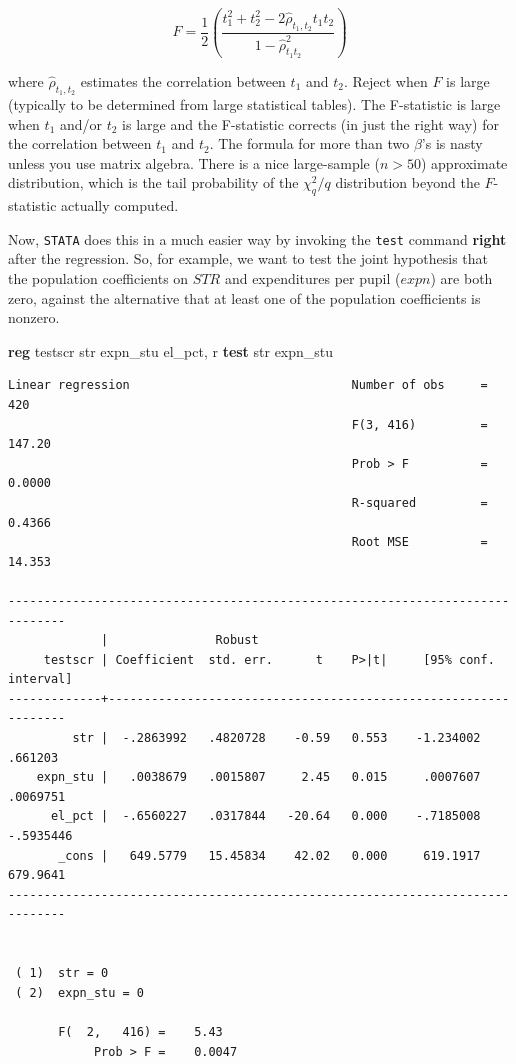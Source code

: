 \documentclass[
]{book}
\newenvironment{Shaded}{\begin{snugshade}}{\end{snugshade}}
\newcommand{\FunctionTok}[1]{\textcolor[rgb]{0.00,0.00,0.00}{#1}}
\newcommand{\KeywordTok}[1]{\textcolor[rgb]{0.13,0.29,0.53}{\textbf{#1}}}
\newcommand{\NormalTok}[1]{#1}
\begin{document}
\begin{equation}
F = \frac{1}{2} \left(\frac{t_1^2 + t_2^2 - 2\hat{\rho}_{t_1,t_2}t_1 t_2}{1-\hat{\rho}^2_{t_1 t_2}}  \right)
\end{equation}

where \(\hat{\rho}_{t_1,t_2}\) estimates the correlation between \(t_1\) and \(t_2\). Reject when \(F\) is large (typically to be determined from large statistical tables). The F-statistic is large when \(t_1\) and/or \(t_2\) is large and the F-statistic corrects (in just the right way) for the correlation between \(t_1\) and \(t_2\). The formula for more than two \(\beta\)'s is nasty unless you use matrix algebra. There is a nice large-sample (\(n>50\)) approximate distribution, which is the tail probability of the \(\chi^2_q /q\) distribution beyond the \(F\)-statistic actually computed.

Now, \texttt{STATA} does this in a much easier way by invoking the \texttt{test} command \textbf{right} after the regression. So, for example, we want to test the joint hypothesis that the population coefficients on \(STR\) and expenditures per pupil (\(expn\)) are both zero, against the alternative that at least one of the population coefficients is nonzero.

\begin{Shaded}
\begin{Highlighting}[]
\KeywordTok{reg}\NormalTok{ testscr str expn\_stu el\_pct, }\FunctionTok{r} 
\KeywordTok{test}\NormalTok{ str expn\_stu}
\end{Highlighting}
\end{Shaded}

\begin{verbatim}
Linear regression                               Number of obs     =        420
                                                F(3, 416)         =     147.20
                                                Prob > F          =     0.0000
                                                R-squared         =     0.4366
                                                Root MSE          =     14.353

------------------------------------------------------------------------------
             |               Robust
     testscr | Coefficient  std. err.      t    P>|t|     [95% conf. interval]
-------------+----------------------------------------------------------------
         str |  -.2863992   .4820728    -0.59   0.553    -1.234002     .661203
    expn_stu |   .0038679   .0015807     2.45   0.015     .0007607    .0069751
      el_pct |  -.6560227   .0317844   -20.64   0.000    -.7185008   -.5935446
       _cons |   649.5779   15.45834    42.02   0.000     619.1917    679.9641
------------------------------------------------------------------------------


 ( 1)  str = 0
 ( 2)  expn_stu = 0

       F(  2,   416) =    5.43
            Prob > F =    0.0047
\end{verbatim}
\end{document}
